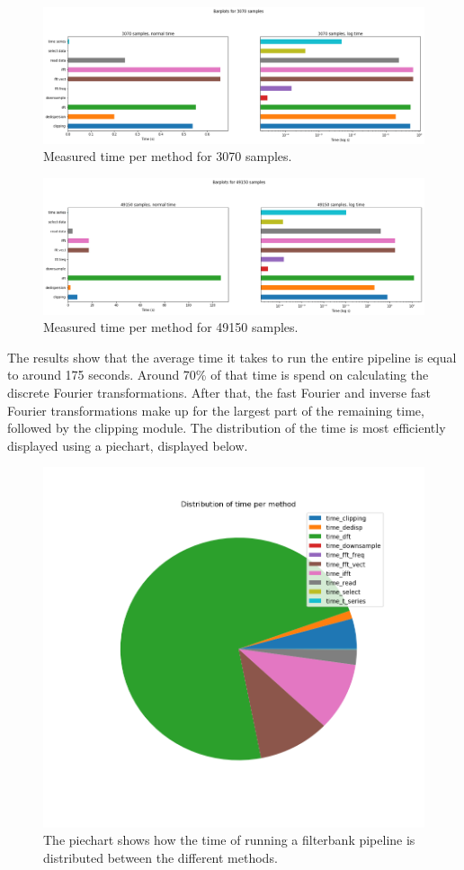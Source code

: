 \documentclass[a4paper,11pt]{report}
\begin{document}
    \begin{figure}[h]
        \centering
        \includegraphics[width=1.2\columnwidth]{barchart_3070}
        \caption{Measured time per method for 3070 samples.}
    \end{figure}


    \begin{figure}[h]
        \centering
        \includegraphics[width=1.2\columnwidth]{barchart_49150}
        \caption{Measured time per method for 49150 samples.}
    \end{figure}

    The results show that the average time it takes to run the entire pipeline is equal to around 175 seconds. Around 70\% of that time is spend on calculating the discrete Fourier transformations.
    After that, the fast Fourier and inverse fast Fourier transformations make up for the largest part of the remaining time, followed by the clipping module. The distribution of the time is most efficiently
    displayed using a piechart, displayed below.

    \begin{figure}[h]
        \includegraphics[width=0.9\columnwidth]{piechart_49150}
        \caption{The piechart shows how the time of running a filterbank pipeline is distributed between the different methods. }
    \end{figure}

    
\end{document}

